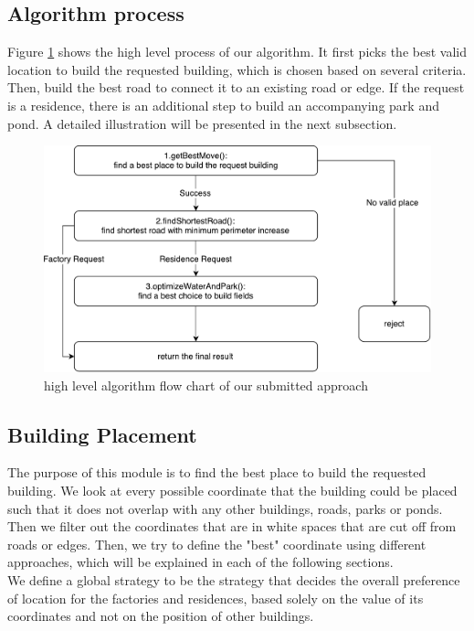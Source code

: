 \subsection{Algorithm process}
Figure \ref{fig:pentos} shows the high level process of our algorithm. It first picks the best valid location to build the requested building, which is chosen based on several criteria. Then, build the best road to connect it to an existing road or edge. If the request is a residence, there is an additional step to build an accompanying park and pond. A detailed illustration will be presented in the next subsection.

\begin{figure}
\center
\includegraphics[scale=0.5]{pentos.pdf}
\caption{high level algorithm flow chart of our submitted approach}
\label{fig:pentos}
\end{figure}

\subsection{Building Placement}
The purpose of this module is to find the best place to build the requested building. We look at every possible coordinate that the building could be placed such that it does not overlap with any other buildings, roads, parks or ponds. Then we filter out the coordinates that are in white spaces that are cut off from roads or edges. Then, we try to define the "best" coordinate using different approaches, which will be explained in each of the following sections. \\
We define a global strategy to be the strategy that decides the overall preference of location for the factories and residences, based solely on the value of its coordinates and not on the position of other buildings.

